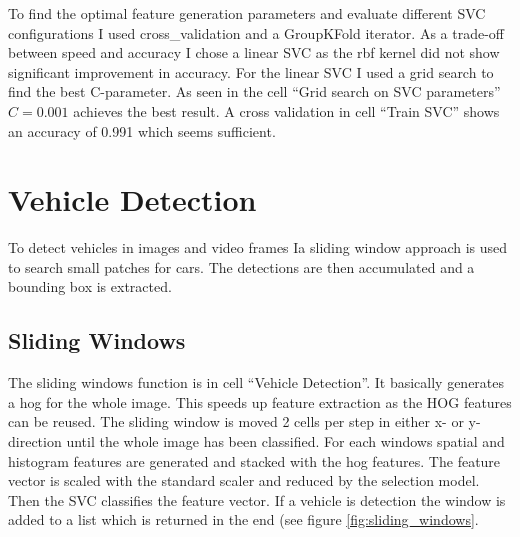 \documentclass[a4paper, 11pt, DIV=14]{scrartcl}
\begin{document}
To find the optimal feature generation parameters and evaluate different SVC configurations I used cross\_validation and a GroupKFold iterator. As a trade-off between speed and accuracy I chose a linear SVC as the rbf kernel did not show significant improvement in accuracy. For the linear SVC I used a grid search to find the best C-parameter. As seen in the cell ``Grid search on SVC parameters'' $C=0.001$ achieves the best result. A cross validation in cell ``Train SVC'' shows an accuracy of 0.991 which seems sufficient. 

\section{Vehicle Detection}
To detect vehicles in images and video frames Ia sliding window approach is used to search small patches for cars. The detections are then accumulated and a bounding box is extracted.

\subsection{Sliding Windows}
The sliding windows function is in cell ``Vehicle Detection''. It basically generates a hog for the whole image. This speeds up feature extraction as the HOG features can be reused. The sliding window is moved 2 cells per step in either x- or y-direction until the whole image has been classified. For each windows spatial and histogram features are generated and stacked with the hog features. The feature vector is scaled with the standard scaler and reduced by the selection model. Then the SVC classifies the feature vector. If a vehicle is detection the window is added to a list which is returned in the end (see figure \ref{fig:sliding_windows}.
\end{document}
